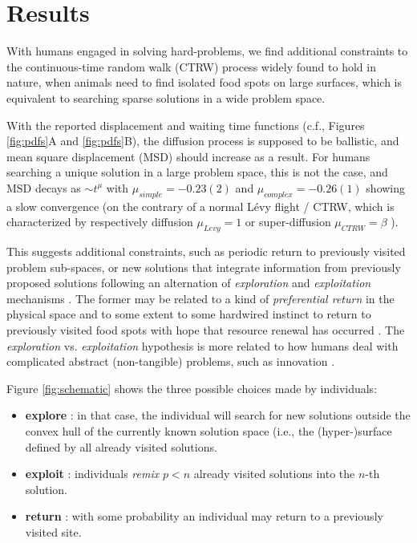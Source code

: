 \section{Results}
With humans engaged in solving hard-problems, we find additional constraints to the continuous-time random walk (CTRW) process widely found to hold in nature, when animals need to find isolated food spots on large surfaces, which is equivalent to searching sparse solutions in a wide problem space.

With the reported displacement and waiting time functions (c.f., Figures \ref{fig:pdfs}A and \ref{fig:pdfs}B), the diffusion process is supposed to be ballistic, and mean square displacement (MSD) should increase as a result. For humans searching a unique solution in a large problem space, this is not the case, and MSD decays as $\sim t^{\mu}$ with $\mu_{simple} =-0.23(2)$ and $\mu_{complex} =- 0.26(1)$ showing a slow convergence (on the contrary of a normal L\'evy flight / CTRW, which is characterized by respectively diffusion $\mu_{Levy} = 1$ or super-diffusion $\mu_{CTRW} = \beta$ \cite{21,23}). 

This suggests additional constraints, such as periodic return to previously visited problem sub-spaces, or new solutions that integrate information from previously proposed solutions following an alternation of {\it exploration} and {\it exploitation} mechanisms \cite{march1991exploration}. The former may be related to a kind of {\it preferential return} in the physical space \cite{song2010modelling} and to some extent to some hardwired instinct to return to previously visited food spots with hope that resource renewal has occurred \cite{}. The {\it exploration} vs. {\it exploitation} hypothesis is more related to how humans deal with complicated abstract (non-tangible) problems, such as innovation \cite{march1991exploration}.

Figure \ref{fig:schematic} shows the three possible choices made by individuals:

\begin{itemize}
  \item {\bf explore} : in that case, the individual will search for new solutions outside the convex hull of the currently known solution space (i.e., the (hyper-)surface defined by all already visited solutions. 
  \item {\bf exploit} : individuals {\it remix} $p < n$ already visited solutions into the $n$-th solution.
  \item {\bf return} : with some probability an individual may return to a previously visited site. 
\end{itemize}

